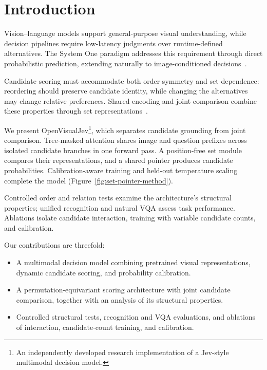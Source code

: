 \section{Introduction}
Vision--language models support general-purpose visual understanding, while decision pipelines require low-latency judgments over runtime-defined alternatives. The System One paradigm addresses this requirement through direct probabilistic prediction, extending naturally to image-conditioned decisions~\citep{yu_2026_visualjev,zhou_2026_pixeljev}.

Candidate scoring must accommodate both order symmetry and set dependence: reordering should preserve candidate identity, while changing the alternatives may change relative preferences. Shared encoding and joint comparison combine these properties through set representations~\citep{zaheer_2017_deepsets,lee_2019_set}.

We present OpenVisualJev\footnote{An independently developed research implementation of a Jev-style multimodal decision model.}, which separates candidate grounding from joint comparison. Tree-masked attention shares image and question prefixes across isolated candidate branches in one forward pass. A position-free set module compares their representations, and a shared pointer produces candidate probabilities. Calibration-aware training and held-out temperature scaling complete the model (Figure~\ref{fig:set-pointer-method}).

Controlled order and relation tests examine the architecture's structural properties; unified recognition and natural VQA assess task performance. Ablations isolate candidate interaction, training with variable candidate counts, and calibration.

Our contributions are threefold:
\begin{itemize}
\item A multimodal decision model combining pretrained visual representations, dynamic candidate scoring, and probability calibration.
\item A permutation-equivariant scoring architecture with joint candidate comparison, together with an analysis of its structural properties.
\item Controlled structural tests, recognition and VQA evaluations, and ablations of interaction, candidate-count training, and calibration.
\end{itemize}
